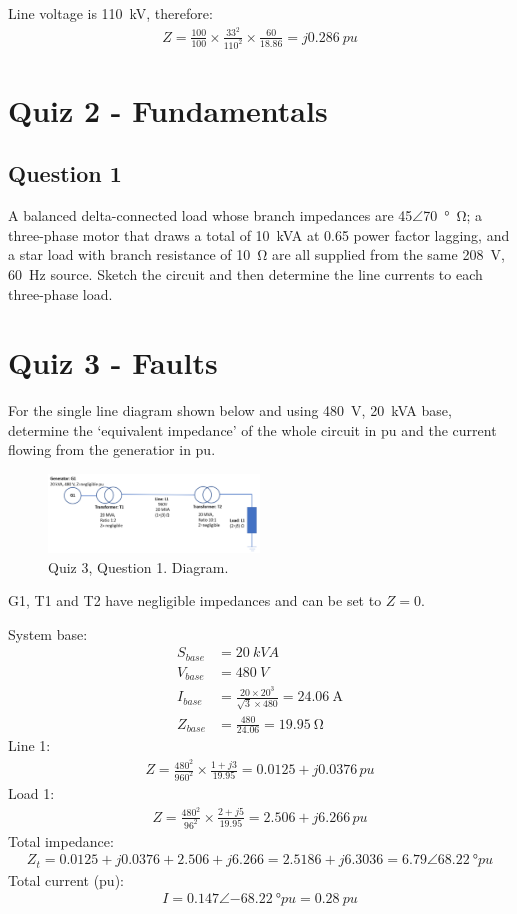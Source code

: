 Line voltage is \SI{110}{kV}, therefore:
\begin{gather}
    Z = \frac{100}{100}\times \frac{33^2}{110^2}\times \frac{60}{18.86} = j\SI{0.286}{pu}
\end{gather}
\chapter{Quiz 2 - Fundamentals}
\section{Question 1}
A balanced delta-connected load whose branch impedances are 45$\angle$\SI{70}{\degree\ohm}; a three-phase motor that draws a total of \SI{10}{kVA} at 0.65 power factor lagging, and a star load with branch resistance of \SI{10}{\ohm} are all supplied from the same \SI{208}{\volt}, \SI{60}{\hertz} source. Sketch the circuit and then determine the line currents to each three-phase load.
\chapter{Quiz 3 - Faults}
For the single line diagram shown below and using \SI{480}{\volt}, \SI{20}{kVA} base, determine the `equivalent impedance' of the whole circuit in pu and the current flowing from the generatior in pu.
\begin{figure}[H]
    \centering
    \includegraphics[width = 0.5\textwidth]{img/figure150.png}
    \caption{Quiz 3, Question 1. Diagram.}
\end{figure}
G1, T1 and T2 have negligible impedances and can be set to $Z = 0$.

System base:
\begin{align}
    S_{base} &= \SI{20}{kVA}\\
    V_{base} &= \SI{480}{V}\\
    I_{base} &= \frac{20\times 20^3}{\sqrt{3}\times 480} = \SI{24.06}{\ampere}\\
    Z_{base} &= \frac{480}{24.06} = \SI{19.95}{\ohm}
\end{align}
Line 1:
\begin{gather}
    Z = \frac{480^2}{960^2}\times \frac{1+j3}{19.95} = 0.0125 + j0.0376\,\si{pu}
\end{gather}
Load 1:
\begin{gather}
    Z = \frac{480^2}{96^2}\times \frac{2+j5}{19.95} = 2.506+j6.266\,\si{pu}
\end{gather}
Total impedance:
\begin{gather}
    Z_t = 0.0125 + j0.0376 + 2.506 + j6.266 = 2.5186 + j6.3036 = 6.79\angle\SI{68.22}{\degree pu}
\end{gather}
Total current (pu):
\begin{gather}
    I = 0.147\angle\SI{-68.22}{\degree pu} = \SI{0.28}{pu}
\end{gather}